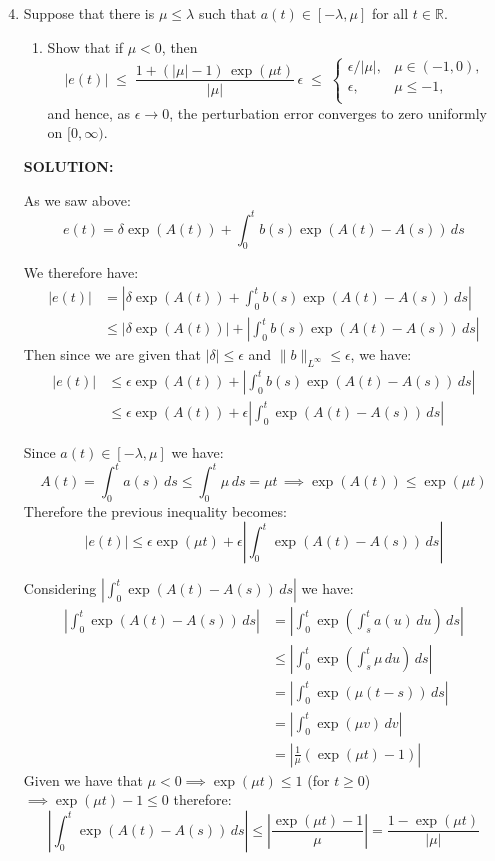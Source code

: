 \documentclass[]{article}
\begin{document}
\begin{enumerate}
\setcounter{enumi}{3}
\item Suppose that there is $\mu\le \lambda$ such that $a(t)\in[-\lambda,\mu]$ for all $t\in\mathbb{R}$.

\begin{enumerate}
\item Show that if $\mu<0$, then
\[
|e(t)| \;\le\; \frac{1+(|\mu|-1)\,\exp(\mu t)}{|\mu|}\,\epsilon \;\le\;
\begin{cases}
\epsilon/|\mu|, & \mu\in(-1,0),\\[2pt]
\epsilon, & \mu\le -1,\\
\end{cases} \tag{5}
\]
\noindent and hence, as $\epsilon\to 0$, the perturbation error converges to zero uniformly on $[0,\infty)$.
\end{enumerate}

\noindent\textbf{SOLUTION:}\newline

\noindent As we saw above:
\[
e(t) = \delta\exp(A(t)) +\int_0^t b(s)\exp(A(t)-A(s))\,ds
\]

\noindent We therefore have:
\begin{align*}
    |e(t)|    &= \left|\delta\exp(A(t)) +\int_0^t b(s)\exp(A(t)-A(s))\,ds\right|\\
    &\leq \left|\delta\exp(A(t))\right| +\left|\int_0^t b(s)\exp(A(t)-A(s))\,ds\right|
\end{align*}
\noindent Then since we are given that $|\delta|\leq \epsilon$ and $\|b\|_{L^\infty}\leq \epsilon$, we have:
\[
\begin{aligned}
|e(t)|
&\leq \epsilon \exp(A(t)) + \left|\int_0^t b(s)\exp(A(t)-A(s))\,ds\right|\\
&\leq \epsilon \exp(A(t)) + \epsilon \left| \int_0^t\exp(A(t)-A(s))\,ds \right|
\end{aligned}
\]


\noindent Since $a(t) \in [-\lambda, \mu]$ we have:
\[
A(t)=\int_0^t a(s)\,ds \leq \int_0^t \mu\,ds = \mu t \, \implies \exp(A(t)) \leq \exp(\mu t)
\]
\noindent Therefore the previous inequality becomes:
\[
|e(t)| \leq \epsilon \exp(\mu t) + \epsilon \left|\int_0^t\exp(A(t)-A(s))\,ds\right|
\]

\noindent Considering $\displaystyle \left|\int_0^t\exp(A(t)-A(s))\,ds\right|$ we have:
\begin{align*}
\left|\int_0^t\exp(A(t)-A(s))\,ds\right|
&= \left|\int_0^t\exp\left(\int_s^t a(u)\,du \right)\,ds\right|\\
&\leq \left|\int_0^t\exp\left(\int_s^t \mu\,du \right)\,ds\right|\\
&= \left|\int_0^t\exp\left( \mu(t-s)\right)\,ds\right|\\
&= \left|\int_0^t \exp(\mu v)\,dv\right|\\
&= \left|\frac{1}{\mu}\left(\exp(\mu t)-1\right)\right|
\end{align*}
\noindent Given we have that $\mu<0 \implies \exp({\mu t})\leq 1$ (for $t\geq 0$) $\implies \exp({\mu t})-1\leq 0$ therefore:
\[
\left|\int_0^t\exp(A(t)-A(s))\,ds\right|
\leq \left|\frac{\exp({\mu t})-1}{\mu}\right|
= \frac{1-\exp({\mu t})}{|\mu|}
\]


\end{enumerate}
\end{document}
